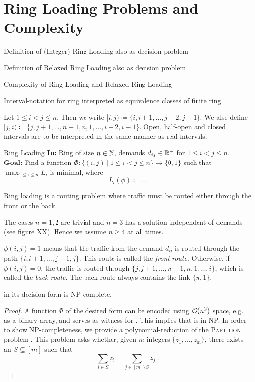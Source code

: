 \section{Ring Loading Problems and Complexity}

Definition of (Integer) Ring Loading also as decision problem

Definition of Relaxed Ring Loading also as decision problem

Complexity of Ring Loading and Relaxed Ring Loading

Interval-notation for ring interpreted as equivalence classes of finite ring.

\begin{notation}
	Let $1 \leq i < j \leq n$.
	Then we write $[i, j) \coloneqq \{i, i+1, \ldots, j-2, j-1\}$.
	We also define $[j, i) \coloneqq \{j, j+1, \ldots, n-1, n, 1, \ldots, i-2, i-1\}$.
	Open, half-open and closed intervals are to be interpreted in the same manner as real intervals.
\end{notation}

\begin{problem}{Ring Loading}
	\textbf{In:} Ring of size $n \in \mathbb{N}$, demands $d_{ij} \in \mathbb{R}^+$ for $1 \leq i < j \leq n$.\\
	\textbf{Goal:} Find a function $\Phi: \{(i, j)~|~1 \leq i < j \leq n\} \rightarrow \{0, 1\}$ such that
	$\max_{1 \leq i \leq n} L_i$ is minimal, where
	\begin{equation}
		L_i(\phi) \coloneqq \ldots
	\end{equation}
\end{problem}
Ring loading is a routing problem where traffic must be routed either through the front or the back.

The cases $n = 1, 2$ are trivial and $n = 3$ has a solution independent of demands (see figure XX). Hence we assume $n \geq 4$ at all times.

$\phi(i, j) = 1$ means that the traffic from the demand $d_{ij}$ is routed through the path $\{i, i+1, \ldots, j-1, j\}$.
This route is called the \emph{front route}.
Otherwise, if $\phi(i, j) = 0$, the traffic is routed through $\{j, j+1, \ldots, n-1, n, 1, \ldots, i\}$, which is called the \emph{back route}.
The back route always contains the link $\{n, 1\}$.

\begin{theorem}
	\RL in its decision form is NP-complete.
\end{theorem}
\begin{proof}
	A function $\Phi$ of the desired form can be encoded using $\mathcal{O}(n^2)$ space, e.g. as a binary array, and serves as witness for \RL.
	This implies that \RL is in NP.
	In order to show NP-completeness, we provide a polynomial-reduction of the \textsc{Partition} problem \cite{karp72}.
	This problem asks whether, given $m$ integers $\{z_1, \ldots, z_m\}$, there exists an $S \subseteq [m]$ such that 
	\begin{equation}
		\sum_{i \in S} z_i = \sum_{j \in [m] \setminus S} z_j \ .
	\end{equation}
	
\end{proof}

